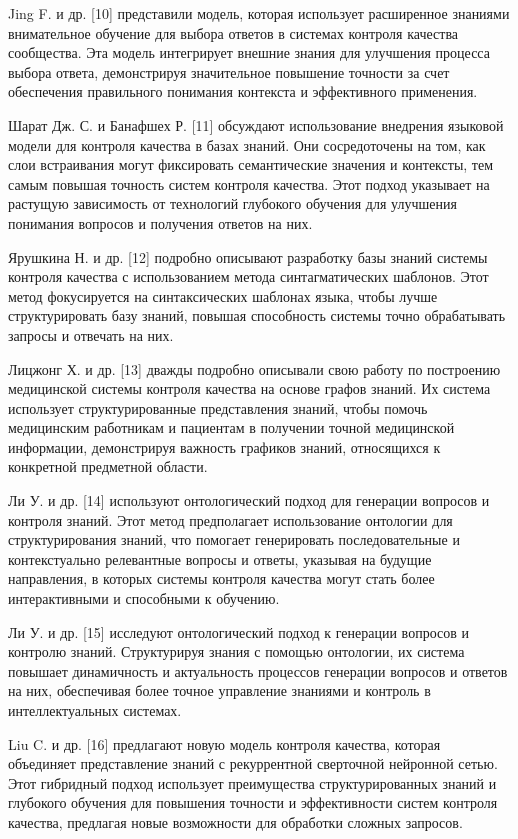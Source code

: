 \begin{multicols}{2}
Jing F. и др. {[}10{]} представили модель, которая использует
расширенное знаниями внимательное обучение для выбора ответов в системах
контроля качества сообщества. Эта модель интегрирует внешние знания для
улучшения процесса выбора ответа, демонстрируя значительное повышение
точности за счет обеспечения правильного понимания контекста и
эффективного применения.

Шарат Дж. С. и Банафшех Р. {[}11{]} обсуждают использование внедрения
языковой модели для контроля качества в базах знаний. Они сосредоточены
на том, как слои встраивания могут фиксировать семантические значения и
контексты, тем самым повышая точность систем контроля качества. Этот
подход указывает на растущую зависимость от технологий глубокого
обучения для улучшения понимания вопросов и получения ответов на них.

Ярушкина Н. и др. {[}12{]} подробно описывают разработку базы знаний
системы контроля качества с использованием метода синтагматических
шаблонов. Этот метод фокусируется на синтаксических шаблонах языка,
чтобы лучше структурировать базу знаний, повышая способность системы
точно обрабатывать запросы и отвечать на них.

Лицжонг Х. и др. {[}13{]} дважды подробно описывали свою работу по
построению медицинской системы контроля качества на основе графов
знаний. Их система использует структурированные представления знаний,
чтобы помочь медицинским работникам и пациентам в получении точной
медицинской информации, демонстрируя важность графиков знаний,
относящихся к конкретной предметной области.

Ли У. и др. {[}14{]} используют онтологический подход для генерации
вопросов и контроля знаний. Этот метод предполагает использование
онтологии для структурирования знаний, что помогает генерировать
последовательные и контекстуально релевантные вопросы и ответы, указывая
на будущие направления, в которых системы контроля качества могут стать
более интерактивными и способными к обучению.

Ли У. и др. {[}15{]} исследуют онтологический подход к генерации
вопросов и контролю знаний. Структурируя знания с помощью онтологии, их
система повышает динамичность и актуальность процессов генерации
вопросов и ответов на них, обеспечивая более точное управление знаниями
и контроль в интеллектуальных системах.

Liu C. и др. {[}16{]} предлагают новую модель контроля качества, которая
объединяет представление знаний с рекуррентной сверточной нейронной
сетью. Этот гибридный подход использует преимущества структурированных
знаний и глубокого обучения для повышения точности и эффективности
систем контроля качества, предлагая новые возможности для обработки
сложных запросов.


\end{multicols}

